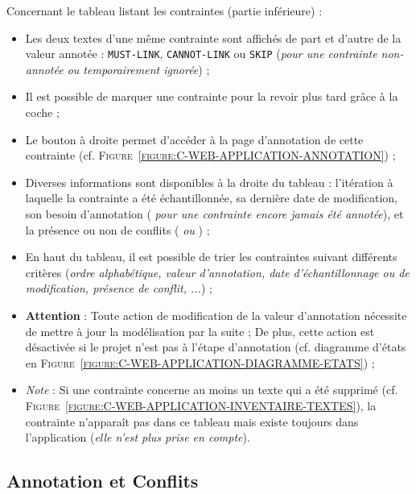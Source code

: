 			Concernant le tableau listant les contraintes (partie inférieure) :
			\begin{itemize}
				\item Les deux textes d'une même contrainte sont affichés de part et d'autre de la valeur annotée : \textcolor{colorApplicationMUSTLINK}{\texttt{MUST-LINK}}, \textcolor{colorApplicationCANNOTLINK}{\texttt{CANNOT-LINK}} ou \texttt{SKIP} (\textit{pour une contrainte non-annotée ou temporairement ignorée}) ;
				\item Il est possible de marquer une contrainte pour la revoir plus tard grâce à la coche \textguillemets{\textcolor{colorApplicationREVIEW}{\faCheckSquare}} ;
				\item Le bouton \textguillemets{\faAngleRight} à droite permet d'accéder à la page d'annotation de cette contrainte (cf. \textsc{Figure~\ref{figure:C-WEB-APPLICATION-ANNOTATION}}) ;
				\item Diverses informations sont disponibles à la droite du tableau : l'itération à laquelle la contrainte a été échantillonnée, sa dernière date de modification, son besoin d'annotation (\textit{\textguillemets{\faQuestion} pour une contrainte encore jamais été annotée}), et la présence ou non de conflits (\textit{\textguillemets{\textcolor{colorApplicationMUSTLINK}{\faCheck}} ou \textguillemets{\textcolor{colorApplicationERROR}{\faExclamation}}}) ;
				\item En haut du tableau, il est possible de trier les contraintes suivant différents critères (\textit{ordre alphabétique, valeur d'annotation, date d'échantillonnage ou de modification, présence de conflit, ...}) ;
				\item \textbf{Attention} : Toute action de modification de la valeur d'annotation nécessite de mettre à jour la modélisation par la suite ;
				De plus, cette action est désactivée si le projet n'est pas à l'étape d'annotation (cf. diagramme d'états en \textsc{Figure~\ref{figure:C-WEB-APPLICATION-DIAGRAMME-ETATS}}) ;
				\item \textit{Note} : Si une contrainte concerne au moins un texte qui a été supprimé (cf. \textsc{Figure~\ref{figure:C-WEB-APPLICATION-INVENTAIRE-TEXTES}}), la contrainte n'apparaît pas dans ce tableau mais existe toujours dans l'application (\textit{elle n'est plus prise en compte}).
			\end{itemize}
	
	
	\newpage
	\subsection{Annotation et Conflits}
	\label{annex:C.2.4-DESCRIPTION-IMPLEMENTATION-INTERACTIVE-CLUSTERING-GUI-ANNOTATION}
	
